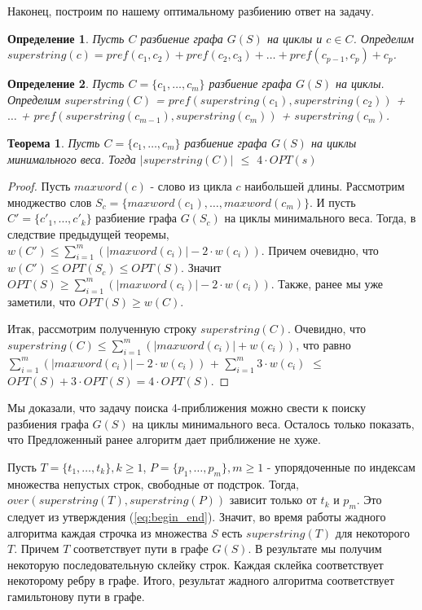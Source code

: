 \documentclass[a4paper,10pt]{article}
\newtheorem{theorem}{Теорема}
\newtheorem{definition}{Определение}
\begin{document}
\noindent Наконец, построим по нашему оптимальному разбиению ответ на задачу.

\begin{definition}
Пусть $C$ разбиение графа $G(S)$ на циклы и $c \in C$.
Определим $superstring(c) = pref( c_1, c_2 ) + pref( c_2, c_3 ) + \dots + pref( c_{p-1}, c_p ) + c_p$.
\end{definition}

\begin{definition}
Пусть $C = \{c_1, \dots, c_m\}$ разбиение графа $G(S)$ на циклы.
Определим $superstring(C)$ = $pref( superstring(c_1), superstring(c_2) )$ + $\dots$ + $pref( superstring(c_{m-1}), superstring(c_m) )$ + $superstring(c_m)$.
\end{definition}

\begin{theorem}
Пусть $C = \{c_1, \dots, c_m\}$ разбиение графа $G(S)$ на циклы минимального веса. Тогда $|superstring(C)|$ $\leq$ $4 \cdot OPT(s)$
\end{theorem}

\begin{proof}
Пусть $maxword(c)$ - слово из цикла $c$ наибольшей длины.
Рассмотрим мноджество слов $S_c = \{ maxword(c_1), \dots, maxword(c_m) \}$.
И пусть $C' = \{c'_1, \dots, c'_k\}$ разбиение графа $G(S_c)$ на циклы минимального веса.
Тогда, в следствие предыдущей теоремы, $w(C') \leq \sum\limits_{i=1}^m ( |maxword(c_i)| - 2 \cdot w(c_i) )$.
Причем очевидно, что $w(C') \leq OPT(S_c) \leq OPT(S)$. Значит $OPT(S) \geq \sum\limits_{i=1}^m ( |maxword(c_i)| - 2 \cdot w(c_i) )$.
Также, ранее мы уже заметили, что $OPT(S) \geq w(C)$.

Итак, рассмотрим полученную строку $superstring(C)$. Очевидно, что $superstring(C) \leq \sum\limits_{i=1}^m ( |maxword(c_i)| + w(c_i) )$, 
что равно $\sum\limits_{i=1}^m ( |maxword(c_i)| - 2 \cdot w(c_i) )$ + $\sum\limits_{i=1}^m 3 \cdot w(c_i)$ $\leq$ $OPT(S) + 3 \cdot OPT(S) = 4 \cdot OPT(S)$.
\end{proof}

Мы доказали, что задачу поиска 4-приближения можно свести к поиску разбиения графа $G(S)$ на циклы минимального веса.
Осталось только показать, что Предложенный ранее алгоритм дает приближение не хуже.

Пусть $T = \{t_1,\dots,t_k\}, k \geq 1$, $P = \{p_1,\dots,p_m\}, m \geq 1$ - упорядоченные по индексам множества непустых строк, свободные от подстрок.
Тогда, $over( superstring(T), superstring(P) )$ зависит только от $t_k$ и $p_m$.
Это следует из утверждения (\ref{eq:begin_end}).
Значит, во время работы жадного алгоритма каждая строчка из множества $S$ есть $superstring(T)$ для некоторого $T$.
Причем $T$ соответствует пути в графе $G(S)$.
В результате мы получим некоторую последовательную склейку строк. Каждая склейка соответствует некоторому ребру в графе.
Итого, результат жадного алгоритма соответствует гамильтонову пути в графе.
\end{document}

